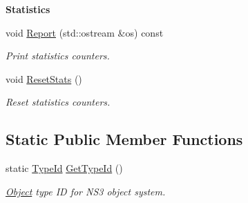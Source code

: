 \begin{Indent}{\bf Statistics}\par
\begin{DoxyCompactItemize}
\item 
void \hyperlink{classns3_1_1MeshPointDevice_a1abd3eaf68b1aa06a337dba8bc0bf4fa}{Report} (std\+::ostream \&os) const 
\begin{DoxyCompactList}\small\item\em Print statistics counters. \end{DoxyCompactList}\item 
void \hyperlink{classns3_1_1MeshPointDevice_ae4dc4d2e337fb3a323dd708d184bbd7f}{Reset\+Stats} ()
\begin{DoxyCompactList}\small\item\em Reset statistics counters. \end{DoxyCompactList}\end{DoxyCompactItemize}
\end{Indent}
\subsection*{Static Public Member Functions}
\begin{DoxyCompactItemize}
\item 
static \hyperlink{classns3_1_1TypeId}{Type\+Id} \hyperlink{classns3_1_1MeshPointDevice_a9705d0ab147e330bb3eeafdfd844f65b}{Get\+Type\+Id} ()
\begin{DoxyCompactList}\small\item\em \hyperlink{classns3_1_1Object}{Object} type ID for N\+S3 object system. \end{DoxyCompactList}\end{DoxyCompactItemize}
